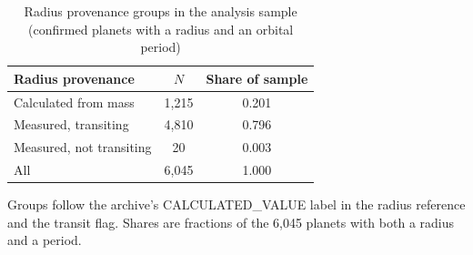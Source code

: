 \begin{table}[t]
\centering
\begin{threeparttable}
\caption{Radius provenance groups in the analysis sample (confirmed planets with a radius and an orbital period)}
\label{tab:groups}
\begin{tabular}{lcc}
\toprule
Radius provenance & $N$ & Share of sample \\
\midrule
Calculated from mass & 1,215 & 0.201 \\
Measured, transiting & 4,810 & 0.796 \\
Measured, not transiting & 20 & 0.003 \\
All & 6,045 & 1.000 \\
\bottomrule
\end{tabular}
\begin{tablenotes}[flushleft]
\footnotesize
\item Groups follow the archive's CALCULATED\_VALUE label in the radius reference and the transit flag. Shares are fractions of the 6,045 planets with both a radius and a period.
\end{tablenotes}
\end{threeparttable}
\end{table}
